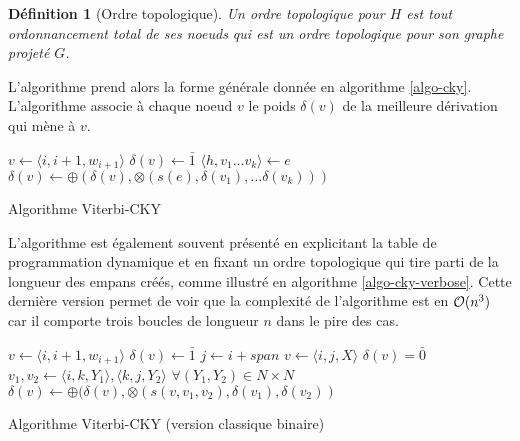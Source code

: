 \documentclass[11pt,openany]{book}
\newtheorem{definition}{Définition}[chapter]
\begin{document}
\begin{definition}[Ordre topologique]
Un ordre topologique pour $H$ est tout ordonnancement total de ses noeuds 
qui est un ordre topologique pour son graphe projeté $G$.
\end{definition}

L'algorithme prend alors la forme générale donnée en algorithme \ref{algo-cky}.
L'algorithme associe à chaque noeud $v$ le poids $\delta(v)$ de la meilleure dérivation qui mène à $v$.

\begin{algorithm}
\begin{algorithmic}[htbp]
\State $v \gets \langle i,i+1,w_{i+1} \rangle$
\State $\delta(v) \gets \bar{1}$
\EndFor
{}
\State $\langle h, v_1\ldots v_k\rangle \gets e$
\State $\delta(v) \gets \oplus (\delta(v) , \otimes(s(e),\delta(v_1) ,\ldots \delta (v_k)))$
\EndFor
\EndFor
\EndFunction
\end{algorithmic}
\caption{\label{algo-cky} Algorithme Viterbi-CKY}
\end{algorithm}

L'algorithme est également souvent présenté en explicitant la table de programmation dynamique et en fixant un ordre topologique 
qui tire parti de la longueur des empans créés, comme illustré en algorithme \ref{algo-cky-verbose}.
Cette dernière version permet de voir que la complexité de l'algorithme est en ${\cal O}(n^3)$ car il comporte trois boucles de longueur $n$
dans le pire des cas.

\begin{algorithm}[htbp]
\begin{algorithmic}
\State $v \gets \langle i,i+1,w_{i+1} \rangle$
\State $\delta(v) \gets \bar{1}$
\EndFor
{}
\State $j \gets i+span$
\State $v \gets \langle i,j,X \rangle$
\State $\delta(v) = \bar{0}$
\State $v_1,v_2 \gets \langle i,k,Y_1 \rangle,\langle k,j,Y_2 \rangle$ \qquad $\forall (Y_1,Y_2) \in N\times N$
\State $\delta(v) \gets \oplus(\delta(v), \otimes(s(v,v_1,v_2),\delta(v_1),\delta(v_2))$
\EndFor
\EndFor
\EndFor
\EndFor
\EndFunction
\end{algorithmic}
\caption{\label{algo-cky-verbose} Algorithme Viterbi-CKY (version classique binaire)}
\end{algorithm}
\end{document}
